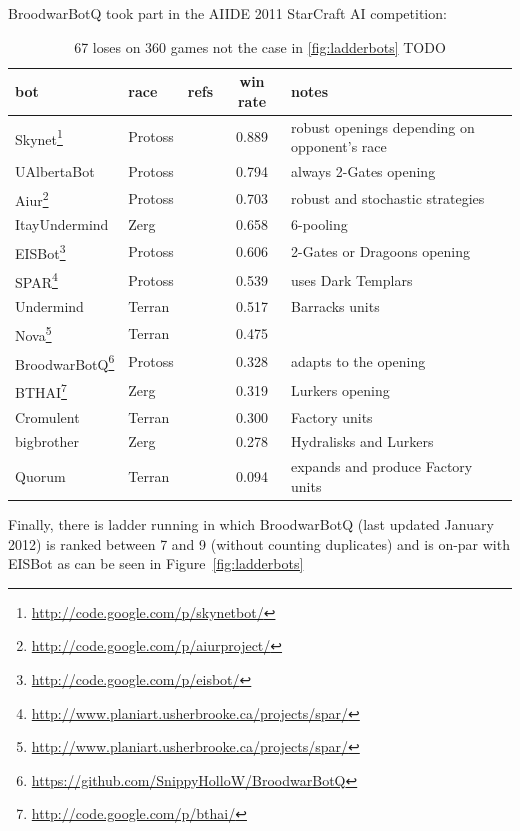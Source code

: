 BroodwarBotQ took part in the AIIDE 2011 StarCraft AI competition:

\begin{table}[h]
    \begin{center}
    \begin{tabular}{|l|l|l|c|l|}
        \hline
        bot & race & refs & win rate & notes \\
        \hline
     Skynet\footnote{\url{http://code.google.com/p/skynetbot/} } & Protoss & & 0.889 & robust openings depending on opponent's race \\
UAlbertaBot & Protoss & \citep{Churchill2011} & 0.794 & always 2-Gates opening \\
       Aiur\footnote{\url{http://code.google.com/p/aiurproject/}} & Protoss & & 0.703 & robust and stochastic strategies \\
ItayUndermind & Zerg & & 0.658 & 6-pooling \\
       EISBot\footnote{\url{http://code.google.com/p/eisbot/}} & Protoss & \citep{WeberCIG10,Weber2010cr} & 0.606 & 2-Gates or Dragoons opening \\
         SPAR\footnote{\url{http://www.planiart.usherbrooke.ca/projects/spar/}} & Protoss & \citep{Kabanza2010} & 0.539 & uses Dark Templars \\
    Undermind & Terran & & 0.517 & Barracks units \\
         Nova\footnote{\url{http://www.planiart.usherbrooke.ca/projects/spar/}} & Terran & \citep{NovaBot2011} &  0.475 \\
 BroodwarBotQ\footnote{\url{https://github.com/SnippyHolloW/BroodwarBotQ}} & Protoss  & \citep{SYNNAEVE:OpeningPred} \citep{SYNNAEVE:Micro} & 0.328 & adapts to the opening \\
        BTHAI\footnote{\url{http://code.google.com/p/bthai/}} & Zerg & \citep{Hagelback2009} & 0.319 & Lurkers opening  \\
    Cromulent & Terran & & 0.300 & Factory units \\
   bigbrother & Zerg & & 0.278 & Hydralisks and Lurkers \\
       Quorum & Terran & & 0.094 & expands and produce Factory units \\
        \hline
    \end{tabular}
    \end{center}
    \caption{67 loses on 360 games not the case in \ref{fig:ladderbots} TODO}
    \label{tab:botsAIIDE}
\end{table}




Finally, there is ladder running in which BroodwarBotQ (last updated January 2012) is ranked between 7 and 9 (without counting duplicates) and is on-par with EISBot \citep{WeberCIG10,Weber2010cr} as can be seen in Figure~\ref{fig:ladderbots}

